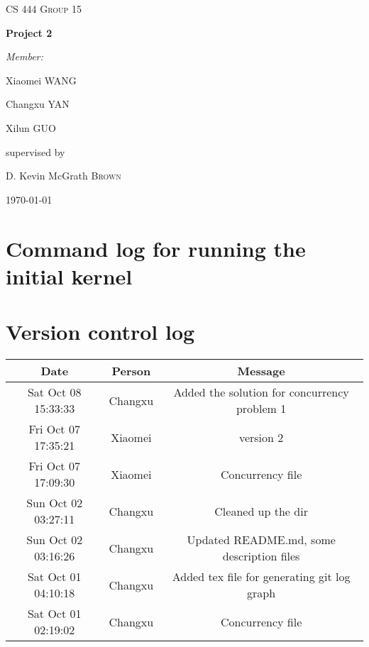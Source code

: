 \documentclass[letterpaper,10pt]{article}
\begin{document}
\begin{titlepage}
\begin{center}
    \vfill
    \textsc{\LARGE CS 444 Group 15}\par
    \vspace{1cm}
    { \huge \bfseries Project 2 \par}
    \vfill
    \emph{Member:}\par
    \vspace{.5cm}
    Xiaomei \textsc{WANG}\par
    \vspace{.5cm}
    Changxu \textsc{YAN}\par
    \vspace{.5cm}
    Xilun \textsc{GUO}\par
    \vfill
    supervised by\par
    D. Kevin McGrath \textsc{Brown}

    \vfill

    {\large \today\par}
\end{center}
\end{titlepage}

\section*{Command log for running the initial kernel}

\section*{Version control log}
\begin{tabular}{@{}ccc@{}}
    \toprule
    Date                & Person   & Message                                                   \\ \midrule
    Sat Oct 08 15:33:33 & Changxu  & Added the solution for concurrency problem 1              \\
    Fri Oct 07 17:35:21 & Xiaomei  & version 2                                                 \\
    Fri Oct 07 17:09:30 & Xiaomei  & Concurrency file                                          \\
    Sun Oct 02 03:27:11 & Changxu  & Cleaned up the dir                                        \\
    Sun Oct 02 03:16:26 & Changxu  & Updated README.md, some description files                 \\
    Sat Oct 01 04:10:18 & Changxu  & Added tex file for generating git log graph               \\
    Sat Oct 01 02:19:02 & Changxu  & Concurrency file                                          \\ \bottomrule
\end{tabular}
\end{document}
